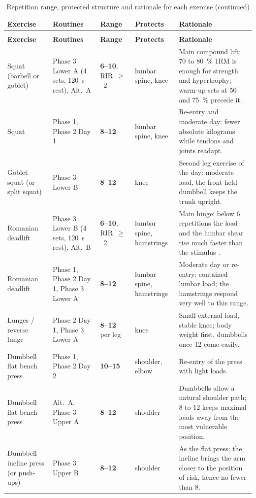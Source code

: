 \documentclass[11pt,a4paper]{article}
\newcommand{\rng}[1]{\textbf{#1}}
\newcommand{\orm}{1RM}
\begin{document}
\begin{longtable}{L{3.0cm} L{3.0cm} L{2.1cm} L{2.1cm} L{5.0cm}}
\caption{Repetition range, protected structure and rationale for each exercise}\label{tab:ex}\\
\toprule
\textbf{Exercise} & \textbf{Routines} & \textbf{Range} & \textbf{Protects} & \textbf{Rationale} \\
\midrule
\endfirsthead
\caption[]{Repetition range, protected structure and rationale for each exercise (continued)}\\
\toprule
\textbf{Exercise} & \textbf{Routines} & \textbf{Range} & \textbf{Protects} & \textbf{Rationale} \\
\midrule
\endhead
\bottomrule
\endfoot
\bottomrule
\endlastfoot
Squat (barbell or goblet) & Phase 3 Lower A (4 sets, 120~s rest), Alt.\ A & \rng{6--10}, RIR~$\geq$~2 & lumbar spine, knee & Main compound lift: 70 to 80~\% \orm{} is enough for strength and hypertrophy; warm-up sets at 50 and 75~\% precede it. \\
Squat & Phase 1, Phase 2 Day 1 & \rng{8--12} & lumbar spine, knee & Re-entry and moderate day: fewer absolute kilograms while tendons and joints readapt. \\
Goblet squat (or split squat) & Phase 3 Lower B & \rng{8--12} & knee & Second leg exercise of the day: moderate load, the front-held dumbbell keeps the trunk upright. \\
Romanian deadlift & Phase 3 Lower B (4 sets, 120~s rest), Alt.\ B & \rng{6--10}, RIR~$\geq$~2 & lumbar spine, hamstrings & Main hinge: below 6 repetitions the load and the lumbar shear rise much faster than the stimulus \citep{cholewicki1991}. \\
Romanian deadlift & Phase 1, Phase 2 Day 1, Phase 3 Lower A & \rng{8--12} & lumbar spine, hamstrings & Moderate day or re-entry: contained lumbar load; the hamstrings respond very well to this range. \\
Lunges / reverse lunge & Phase 2 Day 1, Phase 3 Lower A & \rng{8--12} per leg & knee & Small external load, stable knee; body weight first, dumbbells once 12 come easily. \\
Dumbbell flat bench press & Phase 1, Phase 2 Day 2 & \rng{10--15} & shoulder, elbow & Re-entry of the press with light loads. \\
Dumbbell flat bench press & Alt.\ A, Phase 3 Upper A & \rng{8--12} & shoulder & Dumbbells allow a natural shoulder path; 8 to 12 keeps maximal loads away from the most vulnerable position. \\
Dumbbell incline press (or push-ups) & Phase 3 Upper B & \rng{8--12} & shoulder & As the flat press; the incline brings the arm closer to the position of risk, hence no fewer than 8. \\

\end{longtable}
\end{document}
